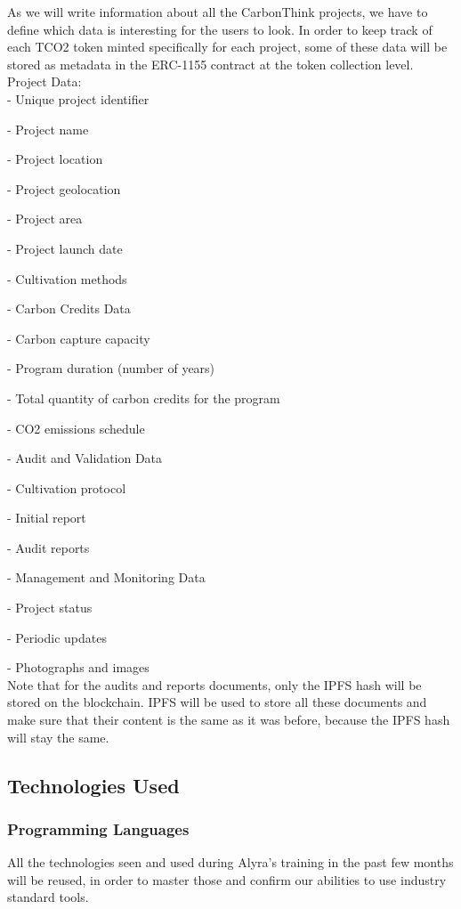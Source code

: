 \documentclass[a4paper, 12pt]{article}
\begin{document}
As we will write information about all the CarbonThink projects, we have to define which data is interesting for the users to look. In order to keep track of each TCO2 token minted specifically for each project, some of these data will be stored as metadata in the ERC-1155 contract at the token collection level.\\

Project Data:\\

- Unique project identifier

- Project name

- Project location

- Project geolocation

- Project area

- Project launch date

- Cultivation methods

- Carbon Credits Data

- Carbon capture capacity

- Program duration (number of years)

- Total quantity of carbon credits for the program

- CO2 emissions schedule

- Audit and Validation Data

- Cultivation protocol

- Initial report

- Audit reports

- Management and Monitoring Data

- Project status

- Periodic updates

- Photographs and images\\

Note that for the audits and reports documents, only the IPFS hash will be stored on the blockchain. IPFS will be used to store all these documents and make sure that their content is the same as it was before, because the IPFS hash will stay the same.

\subsection{Technologies Used}
\subsubsection{Programming Languages}

All the technologies seen and used during Alyra's training in the past few months will be reused, in order to master those and confirm our abilities to use industry standard tools.\\
\end{document}
